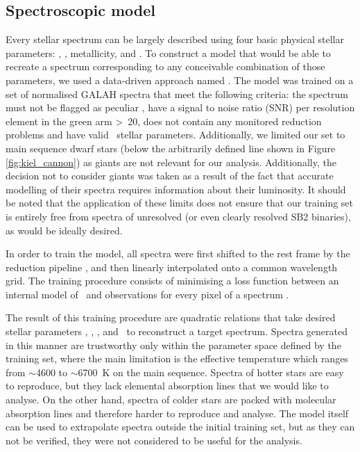 \subsection{Spectroscopic model}
\label{sec:s_model}
Every stellar spectrum can be largely described using four basic physical stellar parameters: \Teff, \Logg, metallicity, and \vsin. To construct a model that would be able to recreate a spectrum corresponding to any conceivable combination of those parameters, we used a data-driven approach named \TC. The model was trained on a set of normalised GALAH spectra that meet the following criteria: the spectrum must not be flagged as peculiar \cite{2017ApJS..228...24T}, have a signal to noise ratio (SNR) per resolution element in the green arm >~20, does not contain any monitored reduction problems and have valid \TC\ stellar parameters. Additionally, we limited our set to main sequence dwarf stars (below the arbitrarily defined line shown in Figure \ref{fig:kiel_cannon}) as giants are not relevant for our analysis. Additionally, the decision not to consider giants was taken as a result of the fact that accurate modelling of their spectra requires information about their luminosity. It should be noted that the application of these limits does not ensure that our training set is entirely free from spectra of unresolved (or even clearly resolved SB2 binaries), as would be ideally desired.

In order to train the model, all spectra were first shifted to the rest frame by the reduction pipeline \cite{2017MNRAS.464.1259K}, and then linearly interpolated onto a common wavelength grid. The training procedure consists of minimising a loss function between an internal model of \TC\ and observations for every pixel of a spectrum \cite{2015ApJ...808...16N}.

The result of this training procedure are quadratic relations that take desired stellar parameters \Teff, \Logg, \Feh, and \vsin\ to reconstruct a target spectrum. Spectra generated in this manner are trustworthy only within the parameter space defined by the training set, where the main limitation is the effective temperature which ranges from $\sim$4600 to $\sim$6700~K on the main sequence. Spectra of hotter stars are easy to reproduce, but they lack elemental absorption lines that we would like to analyse. On the other hand, spectra of colder stars are packed with molecular absorption lines and therefore harder to reproduce and analyse. The model itself can be used to extrapolate spectra outside the initial training set, but as they can not be verified, they were not considered to be useful for the analysis.

